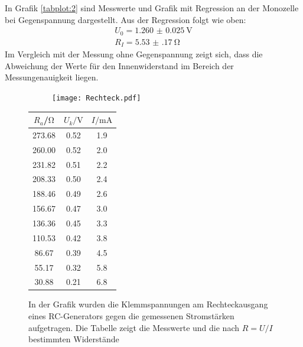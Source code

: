 In Grafik \ref{tabplot:2} sind Messwerte und Grafik mit Regression an der Monozelle bei Gegenspannung
dargestellt. Aus der Regression folgt wie oben:
\begin{equation*}
  \begin{split}
    U_0 = \SI{1.260(25)}{\volt}\\
    R_I = \SI{5.53(17)}{\ohm}
  \end{split}
\end{equation*}
Im Vergleich mit der Messung ohne Gegenspannung zeigt sich, dass die Abweichung der Werte für den Innenwiderstand
im Bereich der Messungenauigkeit liegen.
\begin{figure}[h]
  \begin{subfigure}{0.74\textwidth}
  \centering
    \texttt{[image: Rechteck.pdf]}
    \label{sub:5}
    \qquad
  \end{subfigure}
  \begin{subtable}{0.25\textwidth}
  \centering
    \begin{tabular}{c c c}
    \toprule
    $R_a$/$\si{\ohm}$ & $U_{k}/\si{\volt}$ & $I/\si{\milli\ampere}$ \\
    \midrule
    273.68 & 0.52 & 1.9 \\
    260.00 & 0.52 & 2.0 \\
    231.82 & 0.51 & 2.2 \\
    208.33 & 0.50 & 2.4 \\
    188.46 & 0.49 & 2.6 \\
    156.67 & 0.47 & 3.0 \\
    136.36 & 0.45 & 3.3 \\
    110.53 & 0.42 & 3.8 \\
    86.67 & 0.39 & 4.5 \\
    55.17 & 0.32 & 5.8 \\
    30.88 & 0.21 & 6.8 \\
    \bottomrule
    \end{tabular}
    \label{sub:6}
    \qquad
  \end{subtable}
  \caption{In der Grafik wurden die Klemmspannungen am Rechteckausgang eines RC-Generators
  gegen die gemessenen Stromstärken aufgetragen. Die Tabelle zeigt die Messwerte und die
   nach $R = U/I$ bestimmten Widerstände}
  \label{tabplot:3}
\end{figure}

